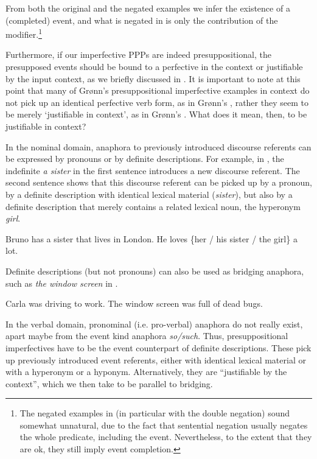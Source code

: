 \documentclass[output=paper,
modfonts,
newtxmath,
hidelinks
]{langscibook}
\begin{document}
\noindent From both the original and the negated examples we infer the existence of a (completed) event, and what is negated in  is only the contribution of the modifier.\footnote{The negated examples in  (in particular  with the double negation) sound somewhat unnatural, due to the fact that sentential negation usually negates the whole predicate, including the event. Nevertheless, to the extent that they are ok, they still imply event completion.}

Furthermore, if our imperfective PPPs are indeed presuppositional, the presupposed events should be bound to a perfective in the context or justifiable by the input context, as we briefly discussed in . It is important to note at this point that many of Grønn's presuppositional imperfective examples in context do not pick up an identical perfective verb form, as in Grønn's , rather they seem to be merely `justifiable in context', as in Grønn's .  What does it mean, then, to be justifiable in context? 

In the nominal domain, anaphora to previously introduced discourse referents can be expressed by pronouns or by definite descriptions. For example, in , the indefinite \textit{a sister} in the first sentence introduces a new discourse referent. The second sentence shows that this discourse referent can be picked up by a pronoun, by a definite description with identical lexical material (\textit{sister}), but also by a definite description that merely contains a related lexical noun, the hyperonym \textit{girl}. 

\ea Bruno has a sister that lives in London. He loves \{her / his sister / the girl\} a lot.\label{Bruno}
\z

\noindent Definite descriptions (but not pronouns) can also be used as bridging anaphora, such as \textit{the window screen} in .

\ea
Carla was driving to work. The window screen was full of dead bugs.\label{Carla}
\z

\noindent In the verbal domain, pronominal (i.e. pro-verbal) anaphora do not really exist, apart maybe from the event kind anaphora \textit{so/such}. Thus, presuppositional imperfectives have to be the event counterpart of definite descriptions. These pick up previously introduced event referents, either with identical lexical material or with a hyperonym or a hyponym. Alternatively, they are ``justifiable by the context'', which we then take to be parallel to bridging.
\end{document}
